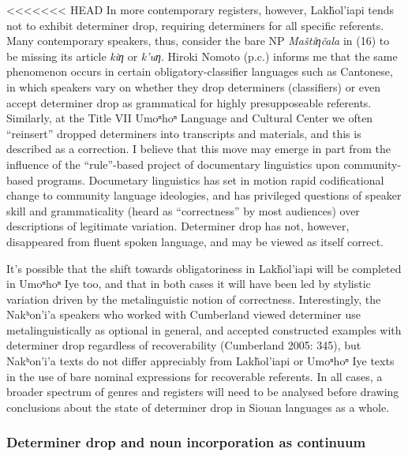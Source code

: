 \documentclass[output=paper]{LSP/langsci}
\begin{document}
<<<<<<< HEAD
In more contemporary registers, however, Lakȟol’iapi tends not to exhibit determiner drop, requiring determiners for all specific referents. Many contemporary speakers, thus, consider the bare NP \emph{Maštíƞčala} in (16) to be missing its article \emph{kiƞ} or \emph{k’uƞ}. Hiroki Nomoto (p.c.) informs me that the same phenomenon occurs in certain obligatory-classifier languages such as Cantonese, in which speakers vary on whether they drop determiners (classifiers) or even accept determiner drop as grammatical for highly presupposeable referents. Similarly, at the Title VII Umoⁿhoⁿ Language and Cultural Center we often “reinsert” dropped determiners into transcripts and materials, and this is described as a correction. I believe that this move may emerge in part from the influence of the “rule”-based project of documentary linguistics upon community-based programs. Documetary linguistics has set in motion rapid codificational change to community language ideologies, and has privileged questions of speaker skill and grammaticality (heard as “correctness” by most audiences) over descriptions of legitimate variation. Determiner drop has not, however, disappeared from fluent spoken language, and may be viewed as itself correct.

	It’s possible that the shift towards obligatoriness in Lakȟol’iapi will be completed in Umoⁿhoⁿ Iye too, and that in both cases it will have been led by stylistic variation driven by the metalinguistic notion of correctness. Interestingly, the Nakʰon’i’a speakers who worked with Cumberland viewed determiner use metalinguistically as optional in general, and accepted constructed examples with determiner drop regardless of recoverability (Cumberland 2005: 345), but Nakʰon’i’a texts do not differ appreciably from Lakȟol’iapi or Umoⁿhoⁿ Iye texts in the use of bare nominal expressions for recoverable referents. In all cases, a broader spectrum of genres and registers will need to be analysed before drawing conclusions about the state of determiner drop in Siouan languages as a whole.

\subsubsection{Determiner drop and noun incorporation as continuum}\label{dropincorp}
\end{document}
